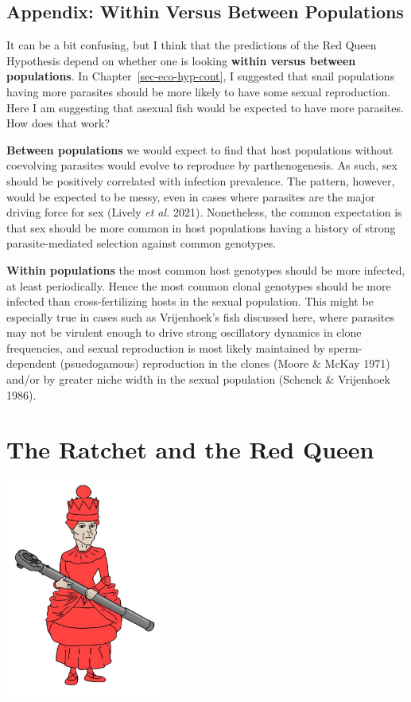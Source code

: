 \documentclass[
  letterpaper,
]{book}
\begin{document}
\section{Appendix: Within Versus Between Populations}\label{sec-app-5}

It can be a bit confusing, but I think that the predictions of the Red
Queen Hypothesis depend on whether one is looking \textbf{within versus
between populations}. In Chapter~\ref{sec-eco-hyp-cont}, I suggested
that snail populations having more parasites should be more likely to
have some sexual reproduction. Here I am suggesting that asexual fish
would be expected to have more parasites. How does that work?

\textbf{Between populations} we would expect to find that host
populations without coevolving parasites would evolve to reproduce by
parthenogenesis. As such, sex should be positively correlated with
infection prevalence. The pattern, however, would be expected to be
messy, even in cases where parasites are the major driving force for sex
(Lively \emph{et al.} 2021). Nonetheless, the common expectation is that
sex should be more common in host populations having a history of strong
parasite-mediated selection against common genotypes.

\textbf{Within populations} the most common host genotypes should be
more infected, at least periodically. Hence the most common clonal
genotypes should be more infected than cross-fertilizing hosts in the
sexual population. This might be especially true in cases such as
Vrijenhoek's fish discussed here, where parasites may not be virulent
enough to drive strong oscillatory dynamics in clone frequencies, and
sexual reproduction is most likely maintained by sperm-dependent
(psuedogamous) reproduction in the clones (Moore \& McKay 1971) and/or
by greater niche width in the sexual population (Schenck \& Vrijenhoek
1986).


\chapter{The Ratchet and the Red Queen}\label{sec-chap6}

\begin{center}
\includegraphics[width=0.4\textwidth,height=\textheight]{images/fig6-1.jpeg}
\end{center}
\end{document}
